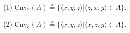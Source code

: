 (1) $\text{Cnv}_2(A) \triangleq \{\langle x, y, z \rangle | \langle z, x, y \rangle \in A\}$.

(2) $\text{Cnv}_3(A) \triangleq \{\langle x, y, z \rangle | \langle x, z, y \rangle \in A\}$.

